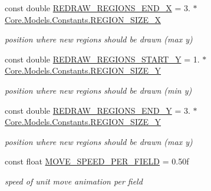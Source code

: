 \begin{DoxyCompactItemize}
const double \hyperlink{classClient_1_1Common_1_1Constants_1_1ClientConstants_a47ccf75710080992ff0e46e829d63b7a}{R\+E\+D\+R\+A\+W\+\_\+\+R\+E\+G\+I\+O\+N\+S\+\_\+\+E\+N\+D\+\_\+\+X} = 3. $\ast$ \hyperlink{classCore_1_1Models_1_1Constants_a2d02174b6a70404c1d8093c81eb47cb2}{Core.\+Models.\+Constants.\+R\+E\+G\+I\+O\+N\+\_\+\+S\+I\+Z\+E\+\_\+\+X}
\begin{DoxyCompactList}\small\item\em position where new regions should be drawn (max y) \end{DoxyCompactList}\item 
const double \hyperlink{classClient_1_1Common_1_1Constants_1_1ClientConstants_a481e9d8491a7f31ad27b060d8738a42b}{R\+E\+D\+R\+A\+W\+\_\+\+R\+E\+G\+I\+O\+N\+S\+\_\+\+S\+T\+A\+R\+T\+\_\+\+Y} = 1. $\ast$ \hyperlink{classCore_1_1Models_1_1Constants_ad7f91cdefc9377eb37c98a50e0d1c068}{Core.\+Models.\+Constants.\+R\+E\+G\+I\+O\+N\+\_\+\+S\+I\+Z\+E\+\_\+\+Y}
\begin{DoxyCompactList}\small\item\em position where new regions should be drawn (min y) \end{DoxyCompactList}\item 
const double \hyperlink{classClient_1_1Common_1_1Constants_1_1ClientConstants_a196dca9d8da3d42fe14ff8246d893c48}{R\+E\+D\+R\+A\+W\+\_\+\+R\+E\+G\+I\+O\+N\+S\+\_\+\+E\+N\+D\+\_\+\+Y} = 3. $\ast$ \hyperlink{classCore_1_1Models_1_1Constants_ad7f91cdefc9377eb37c98a50e0d1c068}{Core.\+Models.\+Constants.\+R\+E\+G\+I\+O\+N\+\_\+\+S\+I\+Z\+E\+\_\+\+Y}
\begin{DoxyCompactList}\small\item\em position where new regions should be drawn (max y) \end{DoxyCompactList}\item 
const float \hyperlink{classClient_1_1Common_1_1Constants_1_1ClientConstants_a1c210518a89a9a7d1f93bc3da1ff0caf}{M\+O\+V\+E\+\_\+\+S\+P\+E\+E\+D\+\_\+\+P\+E\+R\+\_\+\+F\+I\+E\+L\+D} = 0.\+50f
\begin{DoxyCompactList}\small\item\em speed of unit move animation per field \end{DoxyCompactList}\end{DoxyCompactItemize}
